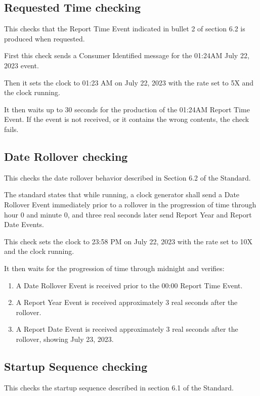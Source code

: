 \subsection{Requested Time checking}

This checks that the Report Time Event indicated in bullet 2 of section 6.2 is
produced when requested.

First this check sends a Consumer Identified message for the 01:24AM  July 22, 2023 event.

Then it sets the clock to 01:23 AM on July 22, 2023 with the rate set to 5X and the clock running.

It then waits up to 30 seconds for the production of the 01:24AM Report Time Event.
If the event is not received, or it contains the wrong contents, the check fails.

\subsection{Date Rollover checking}

This checks the date rollover behavior described in Section 6.2 of the Standard.

The standard states that while running, a clock generator shall send a Date Rollover Event
immediately prior to a rollover in the progression of time through hour 0 and minute 0,
and three real seconds later send Report Year and Report Date Events.

This check sets the clock to 23:58 PM on July 22, 2023 with the rate set to 10X
and the clock running.

It then waits for the progression of time through midnight and verifies:
\begin{enumerate}
\item A Date Rollover Event is received prior to the 00:00 Report Time Event.
\item A Report Year Event is received approximately 3 real seconds after the rollover.
\item A Report Date Event is received approximately 3 real seconds after the rollover,
      showing July 23, 2023.
\end{enumerate}

\subsection{Startup Sequence checking}

This checks the startup sequence described in section 6.1 of the Standard.

